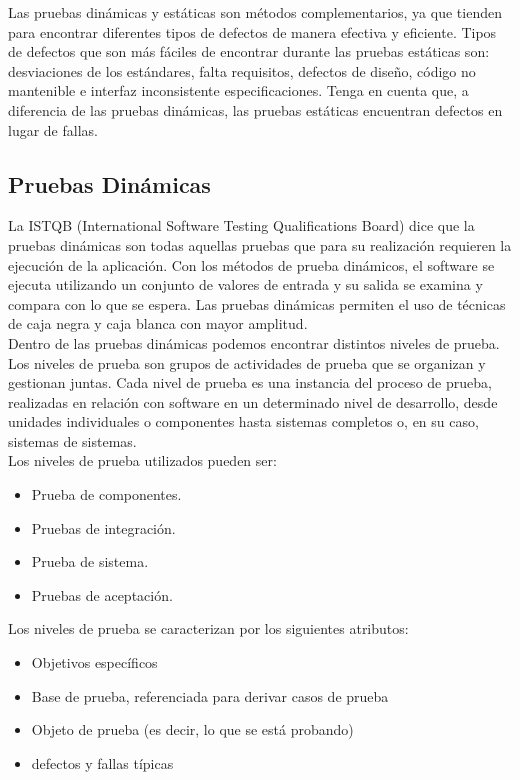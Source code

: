 Las pruebas dinámicas y estáticas son métodos complementarios, ya que tienden
para encontrar diferentes tipos de defectos de manera efectiva y eficiente. Tipos de defectos que son más fáciles de encontrar durante las pruebas estáticas son: desviaciones de los estándares, falta requisitos, defectos de diseño, código no mantenible e interfaz inconsistente especificaciones. Tenga en cuenta que, a diferencia de las pruebas dinámicas, las pruebas estáticas encuentran defectos en lugar de fallas.


\subsection{Pruebas Dinámicas}

La ISTQB (International Software Testing Qualifications Board) dice que la pruebas dinámicas son todas aquellas pruebas que para su realización requieren la ejecución de la aplicación. Con los métodos de prueba dinámicos, el software se ejecuta utilizando un conjunto de valores de entrada y su salida se examina y compara con lo que se espera.   Las pruebas dinámicas permiten el uso de técnicas de caja negra y caja blanca con mayor amplitud.\\

Dentro de las pruebas dinámicas podemos encontrar distintos niveles de prueba. Los niveles de prueba son grupos de actividades de prueba que se organizan y gestionan juntas. Cada nivel de prueba es una instancia del proceso de prueba, realizadas en relación con software en un determinado nivel de desarrollo, desde unidades individuales o componentes hasta sistemas completos o, en su caso, sistemas de sistemas.\\

Los niveles de prueba utilizados pueden ser:

\begin{itemize}
	\item Prueba de componentes.
	\item Pruebas de integración.
	\item Prueba de sistema.
	\item Pruebas de aceptación.
\end{itemize}

Los niveles de prueba se caracterizan por los siguientes atributos:

\begin{itemize}
	\item Objetivos específicos
	\item Base de prueba, referenciada para derivar casos de prueba
	\item Objeto de prueba (es decir, lo que se está probando)
	\item defectos y fallas típicas
\end{itemize}


